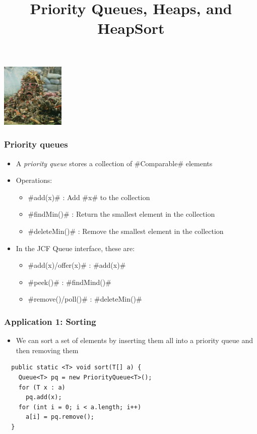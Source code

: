\documentclass[xcolor=dvipsnames]{beamer}
\title{Priority Queues, Heaps, and HeapSort}
\author{}
\date{}
\begin{document}
\begin{frame}
  \titlepage
  \begin{center}
    \includegraphics[height=1.2in]{images/heap.jpg}
  \end{center}
\end{frame}

\begin{frame}
  \frametitle{Priority queues}
  \begin{itemize}
    \item<1->A \emph{priority queue} stores a collection of #Comparable# elements
    \item<2->Operations:
    \begin{itemize}
      \item<3-> #add(x)# : Add #x# to the collection
      \item<4-> #findMin()# : Return the smallest element in the collection
      \item<5-> #deleteMin()# : Remove the smallest element in the collection
    \end{itemize}
    \item<6-> In the JCF Queue interface, these are:
    \begin{itemize}
      \item #add(x)/offer(x)# : #add(x)#
      \item #peek()# : #findMind()#
      \item #remove()/poll()# : #deleteMin()#
    \end{itemize}
  \end{itemize}
\end{frame}

\begin{frame}[fragile]
  \frametitle{Application 1: Sorting}

  \begin{itemize}
    \item We can sort a set of elements by inserting them all into a priority queue and then removing them  
  \end{itemize}
\begin{lstlisting}
  public static <T> void sort(T[] a) {
    Queue<T> pq = new PriorityQueue<T>();
    for (T x : a) 
      pq.add(x);
    for (int i = 0; i < a.length; i++)
      a[i] = pq.remove();
  }
\end{lstlisting}
\end{frame}
\end{document}
